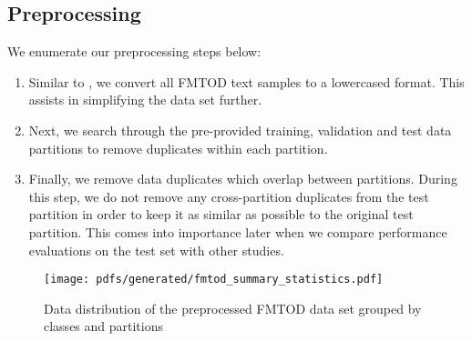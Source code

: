 \subsection{Preprocessing}

We enumerate our preprocessing steps below:

\begin{enumerate}{}
  \item Similar to \citet{schwartz2018sopa}, we convert all FMTOD text samples
  to a lowercased format. This assists in simplifying the data set further.
  \item Next, we search through the pre-provided training, validation and test
  data partitions to remove duplicates within each partition.
  \item Finally, we remove data duplicates which overlap between partitions.
  During this step, we do not remove any cross-partition duplicates from the
  test partition in order to keep it as similar as possible to the original test
  partition. This comes into importance later when we compare performance
  evaluations on the test set with other studies.
\end{enumerate}

\begin{figure}[t!]
  \centering
  \texttt{[image: pdfs/generated/fmtod\_summary\_statistics.pdf]}
  \caption{Data distribution of the preprocessed FMTOD data set grouped by
    classes and partitions}
  \label{fig:fmtod}
\end{figure}

